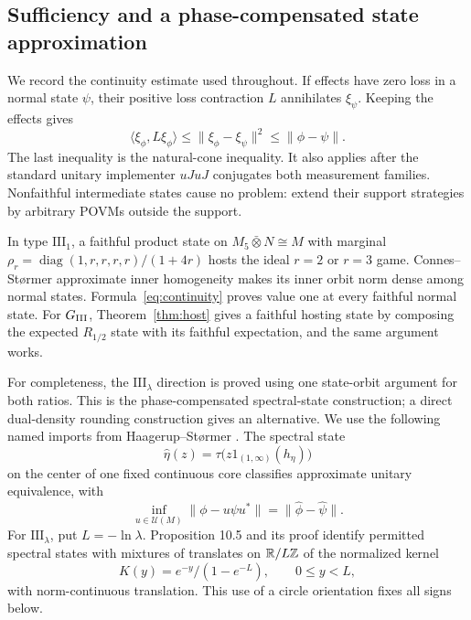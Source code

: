 \subsection{Sufficiency and a phase-compensated state approximation}
We record the continuity estimate used throughout. If effects have zero loss in a normal state $\psi$, their positive loss contraction $L$ annihilates $\xi_\psi$. Keeping the effects gives
\begin{equation}\label{eq:continuity}
 \langle\xi_\phi,L\xi_\phi\rangle
 \le\|\xi_\phi-\xi_\psi\|^2\le\|\phi-\psi\|.
\end{equation}
The last inequality is the natural-cone inequality. It also applies after the standard unitary implementer $uJuJ$ conjugates both measurement families. Nonfaithful intermediate states cause no problem: extend their support strategies by arbitrary POVMs outside the support.

In type $\mathrm{III}_1$, a faithful product state on $M_5\bar\otimes N\cong M$ with marginal $\rho_r=\operatorname{diag}(1,r,r,r,r)/(1+4r)$ hosts the ideal $r=2$ or $r=3$ game. Connes--St\o rmer approximate inner homogeneity \cite{CS,Haagerup} makes its inner orbit norm dense among normal states. Formula~\eqref{eq:continuity} proves value one at every faithful normal state. For $G_{\mathrm{III}}$, Theorem~\ref{thm:host} gives a faithful hosting state by composing the expected $R_{1/2}$ state with its faithful expectation, and the same argument works.

For completeness, the $\mathrm{III}_\lambda$ direction is proved using one state-orbit argument for both ratios. This is the phase-compensated spectral-state construction; a direct dual-density rounding construction gives an alternative. We use the following named imports from Haagerup--St\o rmer \cite{HS}. The spectral state
\[
 \widehat\eta(z)=\tau\bigl(z1_{(1,\infty)}(h_\eta)\bigr)
\]
on the center of one fixed continuous core classifies approximate unitary equivalence, with
\begin{equation}\label{eq:orbit}
 \inf_{u\in\mathcal U(M)}\|\phi-u\psi u^*\|=\|\widehat\phi-\widehat\psi\|.
\end{equation}
For $\mathrm{III}_\lambda$, put $L=-\ln\lambda$. Proposition 10.5 and its proof identify permitted spectral states with mixtures of translates on $\mathbb R/L\mathbb Z$ of the normalized kernel
\[
 K(y)=e^{-y}/(1-e^{-L}),\qquad0\le y<L,
\]
with norm-continuous translation. This use of a circle orientation fixes all signs below.

